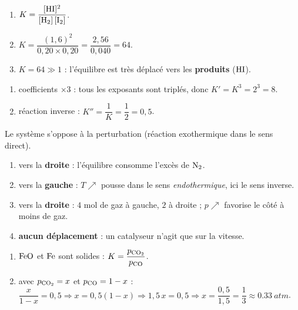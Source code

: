 \documentclass[11pt,a4paper]{article}
\begin{document}
\begin{corrige}
\begin{enumerate}[label=\alph*)]
  \item $K = \dfrac{[\ce{HI}]^{2}}{[\ce{H2}]\,[\ce{I2}]}$.
  \item $K = \dfrac{(1{,}6)^{2}}{0{,}20\times 0{,}20} = \dfrac{2{,}56}{0{,}040} = 64$.
  \item $K=64\gg 1$ : l'équilibre est très déplacé vers les \textbf{produits} ($\ce{HI}$).
\end{enumerate}
\end{corrige}

\begin{corrige}
\begin{enumerate}[label=\alph*)]
  \item coefficients $\times 3$ : tous les exposants sont triplés, donc $K' = K^{3} = 2^{3} = 8$.
  \item réaction inverse : $K'' = \dfrac{1}{K} = \dfrac{1}{2} = 0{,}5$.
\end{enumerate}
\end{corrige}

\begin{corrige}
Le système s'oppose à la perturbation (réaction exothermique dans le sens direct).
\begin{enumerate}[label=\alph*)]
  \item vers la \textbf{droite} : l'équilibre consomme l'excès de $\ce{N2}$.
  \item vers la \textbf{gauche} : $T\nearrow$ pousse dans le sens \emph{endothermique}, ici le sens inverse.
  \item vers la \textbf{droite} : $4$ mol de gaz à gauche, $2$ à droite ; $p\nearrow$ favorise le côté à moins de gaz.
  \item \textbf{aucun déplacement} : un catalyseur n'agit que sur la vitesse.
\end{enumerate}
\end{corrige}

\begin{corrige}
\begin{enumerate}[label=\alph*)]
  \item $\ce{FeO}$ et $\ce{Fe}$ sont solides : $K = \dfrac{p_{\ce{CO2}}}{p_{\ce{CO}}}$.
  \item avec $p_{\ce{CO2}}=x$ et $p_{\ce{CO}}=1-x$ : $\dfrac{x}{1-x}=0{,}5 \Rightarrow x = 0{,}5(1-x) \Rightarrow 1{,}5\,x = 0{,}5 \Rightarrow x = \dfrac{0{,}5}{1{,}5} = \dfrac{1}{3}\approx\qty{0.33}{atm}$.
\end{enumerate}
\end{corrige}
\end{document}
